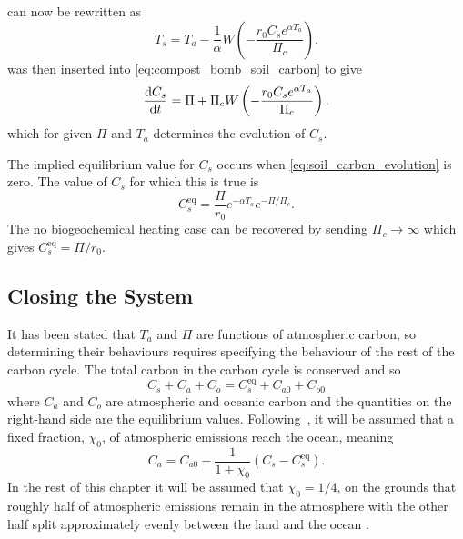  can now be rewritten as
\begin{equation}
  \label{eq:soil_temperature_equilibrium_nppc}
  T_s = T_a - \frac{1}{\alpha} W\left(-\frac{r_0C_s e^{\alpha T_a}}{\Pi_c} \right).
\end{equation}
 was then inserted into \cref{eq:compost_bomb_soil_carbon} to give
\begin{equation}
  \label{eq:soil_carbon_evolution}
  \dv{C_s}{t} = \Pi + \Pi_c W\left(-\frac{r_0C_s e^{\alpha T_a}}{\Pi_c} \right).
\end{equation}
which for given $\Pi$ and $T_a$ determines the evolution of $C_s$.

The implied equilibrium value for $C_s$ occurs when \cref{eq:soil_carbon_evolution} is zero. The value of $C_s$ for which this is true is
\begin{equation}
  \label{eq:equilibrium_soil_carbon_pic}
  C_s^{\mathrm{eq}} = \frac{\Pi}{r_0} e^{-\alpha T_a} e^{-\Pi/\Pi_c}.
\end{equation}
The no biogeochemical heating case can be recovered by sending $\Pi_c \rightarrow \infty$ which gives $C_s^{\mathrm{eq}} = \Pi/r_0$.

\subsection{Closing the System}
It has been stated that $T_a$ and $\Pi$ are functions of atmospheric carbon, so determining their behaviours requires specifying the behaviour of the rest of the carbon
cycle. The total carbon in the carbon cycle is conserved and so
\begin{equation}
  \label{eq:carbon_conservation}
  C_s + C_a + C_o = C_s^{\mathrm{eq}} + C_{a0} + C_{o0}
\end{equation}
where $C_a$ and $C_o$ are atmospheric and oceanic carbon and the quantities on the right-hand side are the equilibrium values.
Following~\cite{Cox2006}, it will be assumed that a fixed fraction, $\chi_0$, of atmospheric emissions reach the ocean, meaning
\begin{equation}
  \label{eq:simple_ocean}
  C_a = C_{a0} -\frac{1}{1+\chi_0} (C_s - C_{s}^{\mathrm{eq}}).
\end{equation}
In the rest of this chapter it will be assumed that $\chi_0 = 1/4$, on the grounds that roughly half of atmospheric emissions remain in the atmosphere \parencite{Jones2005}
with the other half split approximately evenly between the land and the ocean \parencite{Friedlingstein2022}.

